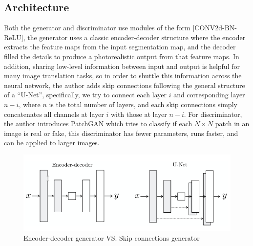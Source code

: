 \subsection{Architecture}
Both the generator and discriminator use modules of the form [CONV2d-BN-ReLU], the 
generator uses a classic encoder-decoder structure where the encoder extracts the 
feature maps from the input segmentation map, and the decoder filled the details 
to produce a photorealistic output from that feature maps. In addition, sharing 
low-level information between input and output is helpful for many image translation
tasks, so in order to shuttle this information across the neural network, the author
adds skip connections following the general structure of a “U-Net”, specifically, we
try to connect each layer $i$ and corresponding layer $n-i$, where $n$ is the total number
of layers, and each skip connections simply concatenates all channels at layer $i$ 
with those at layer $n-i$. For discriminator, the author introduces PatchGAN which 
tries to classify if each $N \times N$ patch in an image is real or fake, this
discriminator has fewer parameters, runs faster, and can be applied to larger images.
\begin{figure}[H]
    \begin{center}
    \includegraphics[width=12cm]{figures/pix2pix-generator}
    \end{center}
    \caption{Encoder-decoder generator VS. Skip connections generator}
    \label{fig:pix2pix-generator}
\end{figure}

